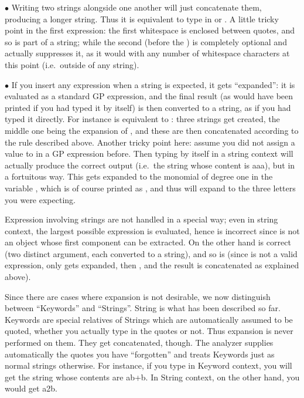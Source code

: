 $\bullet$ Writing two strings alongside one another will just concatenate
them, producing a longer string. Thus it is equivalent to type in
 or . A little tricky point in the first expression:
the first whitespace is enclosed between quotes, and so is part of a string;
while the second (before the ) is completely optional and 
actually suppresses it, as it would with any number of whitespace characters
at this point (i.e.~outside of any string).

$\bullet$ If you insert any expression when a string is expected, it gets
``expanded'': it is evaluated as a standard GP expression, and the final
result (as would have been printed if you had typed it by itself) is then
converted to a string, as if you had typed it directly. For instance  is equivalent to : three strings get created, the middle
one being the expansion of , and these are then concatenated
according to the rule described above. Another tricky point here: assume you
did not assign a value to  in a GP expression before. Then typing
 by itself in a string context will actually produce the correct
output (i.e.~the string whose content is aaa), but in a fortuitous way. This
 gets expanded to the monomial of degree one in the variable
, which is of course printed as , and thus will expand to
the three letters you were expecting.

 Expression involving strings are not handled in a
special way; even in string context, the largest possible expression is
evaluated, hence  is incorrect since  is not an
object whose first component can be extracted. On the other hand
 is correct (two distinct argument, each converted to a
string), and so is  (since  is not a valid
expression, only  gets expanded, then , and the result is
concatenated as explained above).

 Since there are cases where expansion is not desirable, we
now distinguish between ``Keywords'' and ``Strings''. String is what has been
described so far. Keywords are special relatives of Strings which are
automatically assumed to be quoted, whether you actually type in the quotes
or not. Thus expansion is never performed on them. They get concatenated,
though. The analyzer supplies automatically the quotes you have ``forgotten''
and treats Keywords just as normal strings otherwise. For instance, if you
type  in Keyword context, you will get the string whose contents
are ab+b. In String context, on the other hand, you would get a2\kbd{*}b.

